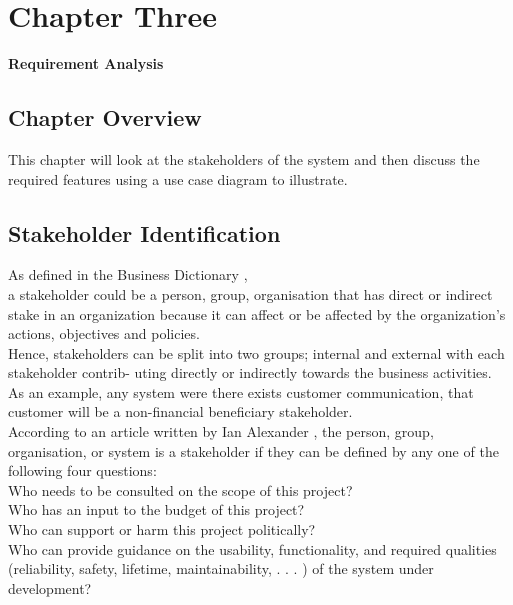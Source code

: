 \documentclass[12pt,a4paper]{article}
\begin{document}
\section{Chapter Three}
{\bfseries \Large Requirement Analysis}\\
\subsection{Chapter Overview}
	This chapter will look at the stakeholders of the system and then discuss the required features using a
use case diagram to illustrate.
\subsection{Stakeholder Identification}
	As defined in the Business Dictionary \cite{Ref:4},\\
a stakeholder could be a person, group, organisation that has direct or indirect stake in an
organization because it can affect or be affected by the organization’s actions, objectives
and policies.\\
Hence, stakeholders can be split into two groups; internal and external with each stakeholder contrib-
uting directly or indirectly towards the business activities.\\
As an example, any system were there exists customer communication, that customer will be a
non-financial beneficiary stakeholder.\\
According to an article written by Ian Alexander \cite{Ref:5}, the person,
group, organisation, or system is a stakeholder if they can be defined by any one of the following four
questions:\\

Who needs to be consulted on the scope of this project?\\

Who has an input to the budget of this project?\\

Who can support or harm this project politically?\\

Who can provide guidance on the usability, functionality, and required qualities (reliability,
safety, lifetime, maintainability, . . . ) of the system under development?\\
\end{document}
